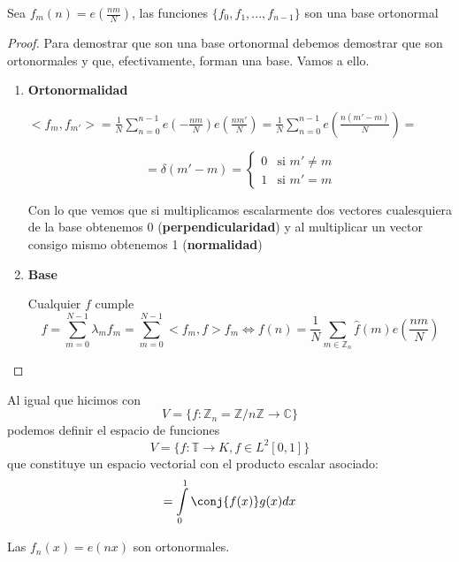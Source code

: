 \begin{prop}
	Sea $f_m(n) = e\left(\frac{nm}{N} \right) $, las funciones $\{ f_0, f_1, ..., f_{n-1}\}$ son una base ortonormal

\end{prop}

\begin{proof}
	Para demostrar que son una base ortonormal debemos demostrar que son ortonormales y que, efectivamente, forman una base. Vamos a ello.

	\begin{enumerate}
	\item \textbf{Ortonormalidad}

	$<f_m, f_{m'}> = \frac{1}{N} \sum^{n-1}_{n = 0} e \left(-\frac{nm}{N} \right) e \left(\frac{nm'}{N} \right) = \frac{1}{N} \sum^{n-1}_{n = 0} e \left( \frac{n (m' - m)}{N} \right) =$

	$$ = \delta (m' - m) = \begin{cases}
		0 & \mbox{si } m' \neq m \\
		1 & \mbox{si } m' = m
	\end{cases}
	$$

	Con lo que vemos que si multiplicamos escalarmente dos vectores cualesquiera de la base obtenemos 0 (\textbf{perpendicularidad}) y al multiplicar un vector consigo mismo obtenemos 1 (\textbf{normalidad})

	\item \textbf{Base}

	Cualquier $f$ cumple
	\[f = \sum^{N - 1}_{m = 0} \lambda_m f_m = \sum^{N - 1}_{m = 0} <f_m, f> f_m \iff f(n) = \frac{1}{N} \sum_{m \in \mathbb{Z}_n} \hat{f}(m) e\left(\frac{nm}{N}\right) \]
	\end{enumerate}

\end{proof}


Al igual que hicimos con
\[V = \{f: \mathbb{Z}_n = \mathbb{Z}/n\mathbb{Z} \rightarrow \mathbb{C} \} \]
podemos definir el espacio de funciones
\[V = \{ f: \mathbb{T} \rightarrow K, f \in L^2 [0,1]\}\]
que constituye un espacio vectorial con el producto escalar asociado:
\[<f,g> = \int\limits^{1}_0 \conj{f(x)} g(x) dx\]

\begin{prop}
	Las $f_n(x) = e(nx)$ son ortonormales.

\end{prop}

